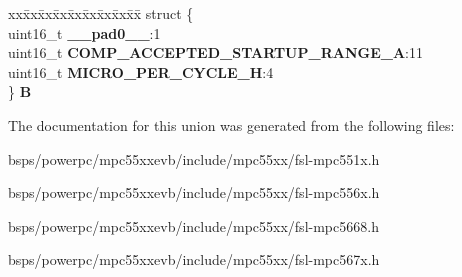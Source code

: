 \begin{DoxyCompactItemize}
\begin{tabbing}
\end{tabbing}\item 
\mbox{\label{unionuPCR22_ad7c99f4803d94e6ad19ef635adc5b2e7}} 
\begin{tabbing}
xx\=xx\=xx\=xx\=xx\=xx\=xx\=xx\=xx\=\kill
struct \{\\
\>uint16\_t {\bfseries \_\_pad0\_\_}:1\\
\>uint16\_t {\bfseries COMP\_ACCEPTED\_STARTUP\_RANGE\_A}:11\\
\>uint16\_t {\bfseries MICRO\_PER\_CYCLE\_H}:4\\
\} {\bfseries B}\\

\end{tabbing}\end{DoxyCompactItemize}


The documentation for this union was generated from the following files\+:\begin{DoxyCompactItemize}
\item 
bsps/powerpc/mpc55xxevb/include/mpc55xx/fsl-\/mpc551x.\+h\item 
bsps/powerpc/mpc55xxevb/include/mpc55xx/fsl-\/mpc556x.\+h\item 
bsps/powerpc/mpc55xxevb/include/mpc55xx/fsl-\/mpc5668.\+h\item 
bsps/powerpc/mpc55xxevb/include/mpc55xx/fsl-\/mpc567x.\+h\end{DoxyCompactItemize}
